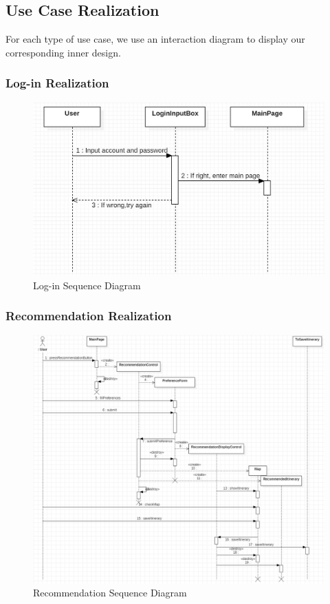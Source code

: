 \documentclass[10pt]{article}
\begin{document}
\subsection{Use Case Realization}
For each type of use case, we use an interaction diagram to display our corresponding inner design.

\subsubsection{Log-in Realization}
\begin{figure}[H]
    \centering
    
    \includegraphics[width=14cm]{login.jpg}
    \caption{Log-in Sequence Diagram}
    \label{Log-in Sequence Diagram}
\end{figure}

\subsubsection{Recommendation Realization}

\begin{figure}[H]
    \centering
    
    \includegraphics[width=14cm]{recommendation.png}
    \caption{Recommendation Sequence Diagram}
    \label{Recommendation Sequence Diagram}
\end{figure}
\end{document}
